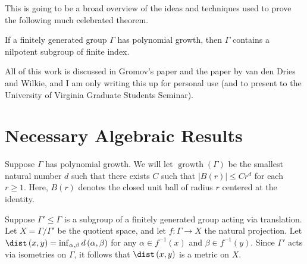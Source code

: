 \documentclass[10pt]{mypackage}
\begin{document}
\RaggedRight
This is going to be a broad overview of the ideas and techniques used to prove the following much celebrated theorem.
\begin{theorem}
  If a finitely generated group $\Gamma$ has polynomial growth, then $\Gamma$ contains a nilpotent subgroup of finite index.
\end{theorem}
All of this work is discussed in Gromov's paper and the paper by van den Dries and Wilkie, and I am only writing this up for personal use (and to present to the University of Virginia Graduate Students Seminar).
\section{Necessary Algebraic Results}%
\begin{definition}
  Suppose $\Gamma$ has polynomial growth. We will let $\operatorname{growth}\left( \Gamma \right)$ be the smallest natural number $d$ such that there exists $C$ such that $\left\vert B\left( r \right) \right\vert\leq Cr^{d}$ for each $r\geq 1$. Here, $B\left( r \right)$ denotes the closed unit ball of radius $r$ centered at the identity.
\end{definition}
Suppose $\Gamma'\leq \Gamma$ is a subgroup of a finitely generated group acting via translation. Let $X = \Gamma/\Gamma'$ be the quotient space, and let $f\colon \Gamma\to X$ the natural projection. Let $\dist\left( x,y \right) = \inf_{\alpha,\beta}d\left( \alpha,\beta \right)$ for any $\alpha\in f^{-1}\left( x \right)$ and $\beta\in f^{-1}\left( y \right)$. Since $\Gamma'$ acts via isometries on $\Gamma$, it follows that $\dist\left( x,y \right)$ is a metric on $X$.
\end{document}
